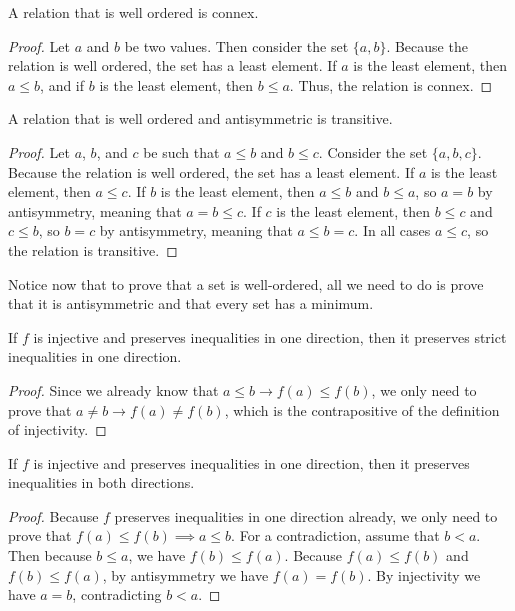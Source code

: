 \documentclass[../math.tex]{subfiles}
\begin{document}
\begin{instance} \label{wo-connex}
    A relation that is well ordered is connex.
\end{instance}
\begin{proof}
    Let $a$ and $b$ be two values.  Then consider the set $\{a, b\}$.  Because
    the relation is well ordered, the set has a least element.  If $a$ is the
    least element, then $a \leq b$, and if $b$ is the least element, then $b
    \leq a$.  Thus, the relation is connex.
\end{proof}

\begin{instance} \label{wo-trans}
    A relation that is well ordered and antisymmetric is transitive.
\end{instance}
\begin{proof}
    Let $a$, $b$, and $c$ be such that $a \leq b$ and $b \leq c$.  Consider the
    set $\{a, b, c\}$.  Because the relation is well ordered, the set has a
    least element.  If $a$ is the least element, then $a \leq c$.  If $b$ is the
    least element, then $a \leq b$ and $b \leq a$, so $a = b$ by antisymmetry,
    meaning that $a = b \leq c$.  If $c$ is the least element, then $b \leq c$
    and $c \leq b$, so $b = c$ by antisymmetry, meaning that $a \leq b = c$.  In
    all cases $a \leq c$, so the relation is transitive.
\end{proof}

Notice now that to prove that a set is well-ordered, all we need to do is prove
that it is antisymmetric and that every set has a minimum.

\begin{instance} \label{homo-le-lt}
    If $f$ is injective and preserves inequalities in one direction, then it
    preserves strict inequalities in one direction.
\end{instance}
\begin{proof}
    Since we already know that $a \leq b \rightarrow f(a) \leq f(b)$, we only
    need to prove that $a \neq b \rightarrow f(a) \neq f(b)$, which is the
    contrapositive of the definition of injectivity.
\end{proof}

\begin{instance} \label{homo-le-le2}
    If $f$ is injective and preserves inequalities in one direction, then it
    preserves inequalities in both directions.
\end{instance}
\begin{proof}
    Because $f$ preserves inequalities in one direction already, we only need to
    prove that $f(a) \leq f(b) \implies a \leq b$.  For a contradiction, assume
    that $b < a$.  Then because $b \leq a$, we have $f(b) \leq f(a)$.  Because
    $f(a) \leq f(b)$ and $f(b) \leq f(a)$, by antisymmetry we have $f(a) =
    f(b)$.  By injectivity we have $a = b$, contradicting $b < a$.
\end{proof}
\end{document}
